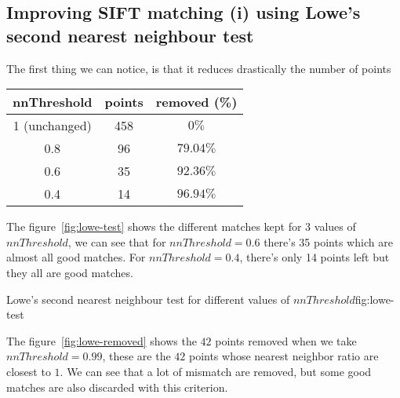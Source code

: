 \documentclass{article}
\begin{document}
\subsection{Improving SIFT matching (i) using Lowe’s second nearest neighbour test}


The first thing we can notice, is that it reduces drastically the
number of points

\begin{center}
\begin{tabular}{|c|c|c|}
  \hline
  nnThreshold & points & removed (\%) \\
  \hline
  1 (unchanged) & 458 & $0\%$ \\
  0.8 & 96 & $79.04\%$ \\
  0.6 & 35 & $92.36\%$ \\
  0.4 & 14 & $96.94\%$ \\
  \hline
\end{tabular}
\end{center}

The figure~\ref{fig:lowe-test} shows the different matches kept for 3
values of $nnThreshold$, we can see that for $nnThreshold = 0.6$
there's 35 points which are almost all good matches.  For $nnThreshold
= 0.4$, there's only 14 points left but they all are good matches.

           {}
           {}
           {Lowe's second nearest neighbour test for different values of $nnThreshold$}{fig:lowe-test}

\newpage

The figure~\ref{fig:lowe-removed} shows the $42$ points removed when
we take $nnThreshold = 0.99$, these are the $42$ points whose nearest
neighbor ratio are closest to $1$. We can see that a lot of mismatch
are removed, but some good matches are also discarded with this
criterion.

\end{document}
